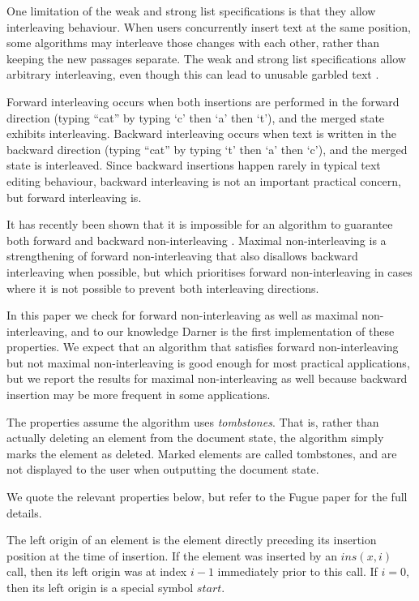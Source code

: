 \documentclass[sigplan,10pt,review,anonymous]{acmart}
\begin{document}
One limitation of the weak and strong list specifications is that they allow interleaving behaviour. When users concurrently insert text at the same position, some algorithms may interleave those changes
with each other, rather than keeping the new passages separate.
The weak and strong list specifications allow arbitrary interleaving, even though this can lead to unusable garbled text \cite{Kleppmann2019}.

Forward interleaving \cite{Weidner2025Fugue} occurs when both insertions are performed in the forward direction (typing ``cat'' by typing `c' then `a' then `t'), and the merged state exhibits interleaving.
Backward interleaving occurs when text is written in the backward direction (typing ``cat'' by typing `t' then `a' then `c'), and the merged state is interleaved.
Since backward insertions happen rarely in typical text editing behaviour, backward interleaving is not an important practical concern, but forward interleaving is.

It has recently been shown that it is impossible for an algorithm to guarantee both forward and backward non-interleaving \cite{Weidner2025Fugue}.
Maximal non-interleaving is a strengthening of forward non-interleaving that also disallows backward interleaving when possible, but which prioritises forward non-interleaving in cases where it is not possible to prevent both interleaving directions.

In this paper we check for forward non-interleaving as well as maximal non-interleaving, and to our knowledge Darner is the first implementation of these properties.
We expect that an algorithm that satisfies forward non-interleaving but not maximal non-interleaving is good enough for most practical applications, but we report the results for maximal non-interleaving as well because backward insertion may be more frequent in some applications.

The properties assume the algorithm uses \emph{tombstones}. That is, rather than actually deleting an element from the document state, the algorithm simply marks the element as deleted. Marked elements are called tombstones, and are not displayed to the user when outputting the document state.

We quote the relevant properties below, but refer to the Fugue paper \cite{Weidner2025Fugue} for the full details.

\begin{definition}
  The left origin of an element is the element directly preceding its insertion position at the time of insertion. If the element was inserted by 
  an $ins(x, i)$ call, then its left origin was at index $i-1$ immediately prior to this call. If $i=0$, then its left origin is a special symbol
  $\mathit{start}$.
\end{definition}
\end{document}
